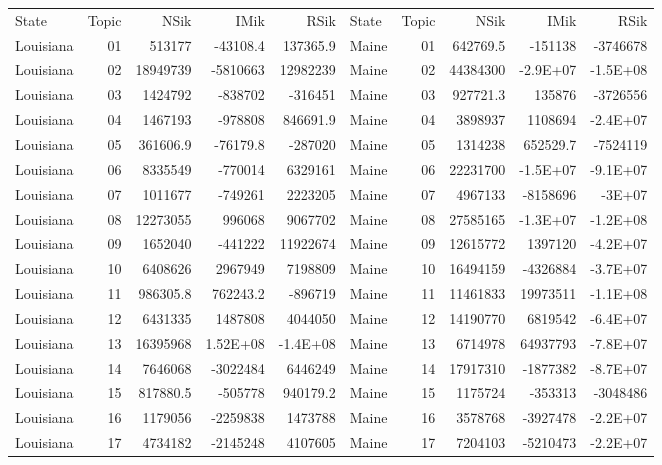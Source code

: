 \begin{table}[]
	\footnotesize
	\begin{tabular}{lrrrrlrrrr}
		State & Topic & NSik & IMik & RSik & State & Topic & NSik & IMik & RSik \\
		Louisiana &  01  & 513177 & -43108.4 & 137365.9 & Maine &  01  & 642769.5 & -151138 & -3746678 \\
		Louisiana &  02  & 18949739 & -5810663 & 12982239 & Maine &  02  & 44384300 & -2.9E+07 & -1.5E+08 \\
		Louisiana &  03  & 1424792 & -838702 & -316451 & Maine &  03  & 927721.3 & 135876 & -3726556 \\
		Louisiana &  04  & 1467193 & -978808 & 846691.9 & Maine &  04  & 3898937 & 1108694 & -2.4E+07 \\
		Louisiana &  05  & 361606.9 & -76179.8 & -287020 & Maine &  05  & 1314238 & 652529.7 & -7524119 \\
		Louisiana &  06  & 8335549 & -770014 & 6329161 & Maine &  06  & 22231700 & -1.5E+07 & -9.1E+07 \\
		Louisiana &  07  & 1011677 & -749261 & 2223205 & Maine &  07  & 4967133 & -8158696 & -3E+07 \\
		Louisiana &  08  & 12273055 & 996068 & 9067702 & Maine &  08  & 27585165 & -1.3E+07 & -1.2E+08 \\
		Louisiana &  09  & 1652040 & -441222 & 11922674 & Maine &  09  & 12615772 & 1397120 & -4.2E+07 \\
		Louisiana &  10 & 6408626 & 2967949 & 7198809 & Maine &  10 & 16494159 & -4326884 & -3.7E+07 \\
		Louisiana &  11 & 986305.8 & 762243.2 & -896719 & Maine &  11 & 11461833 & 19973511 & -1.1E+08 \\
		Louisiana &  12 & 6431335 & 1487808 & 4044050 & Maine &  12 & 14190770 & 6819542 & -6.4E+07 \\
		Louisiana &  13 & 16395968 & 1.52E+08 & -1.4E+08 & Maine &  13 & 6714978 & 64937793 & -7.8E+07 \\
		Louisiana &  14 & 7646068 & -3022484 & 6446249 & Maine &  14 & 17917310 & -1877382 & -8.7E+07 \\
		Louisiana &  15 & 817880.5 & -505778 & 940179.2 & Maine &  15 & 1175724 & -353313 & -3048486 \\
		Louisiana &  16 & 1179056 & -2259838 & 1473788 & Maine &  16 & 3578768 & -3927478 & -2.2E+07 \\
		Louisiana &  17 & 4734182 & -2145248 & 4107605 & Maine &  17 & 7204103 & -5210473 & -2.2E+07 \\

\end{tabular}
\end{table}

